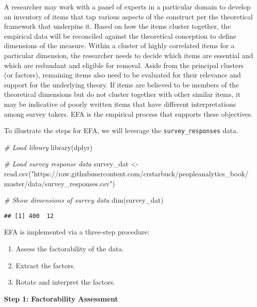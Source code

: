 \documentclass[
]{book}
\newenvironment{Shaded}{\begin{snugshade}}{\end{snugshade}}
\newcommand{\CommentTok}[1]{\textcolor[rgb]{0.56,0.35,0.01}{\textit{#1}}}
\newcommand{\FunctionTok}[1]{\textcolor[rgb]{0.00,0.00,0.00}{#1}}
\newcommand{\NormalTok}[1]{#1}
\newcommand{\OtherTok}[1]{\textcolor[rgb]{0.56,0.35,0.01}{#1}}
\newcommand{\StringTok}[1]{\textcolor[rgb]{0.31,0.60,0.02}{#1}}
\providecommand{\tightlist}{%
  \setlength{\itemsep}{0pt}\setlength{\parskip}{0pt}}
\begin{document}
A researcher may work with a panel of experts in a particular domain to develop an inventory of items that tap various aspects of the construct per the theoretical framework that underpins it. Based on how the items cluster together, the empirical data will be reconciled against the theoretical conception to define dimensions of the measure. Within a cluster of highly correlated items for a particular dimension, the researcher needs to decide which items are essential and which are redundant and eligible for removal. Aside from the principal clusters (or factors), remaining items also need to be evaluated for their relevance and support for the underlying theory. If items are believed to be members of the theoretical dimensions but do not cluster together with other similar items, it may be indicative of poorly written items that have different interpretations among survey takers. EFA is the empirical process that supports these objectives.

To illustrate the steps for EFA, we will leverage the \texttt{survey\_responses} data.

\begin{Shaded}
\begin{Highlighting}[]
\CommentTok{\# Load library}
\FunctionTok{library}\NormalTok{(dplyr)}

\CommentTok{\# Load survey response data}
\NormalTok{survey\_dat }\OtherTok{\textless{}{-}} \FunctionTok{read.csv}\NormalTok{(}\StringTok{"https://raw.githubusercontent.com/crstarbuck/peopleanalytics\_book/master/data/survey\_responses.csv"}\NormalTok{)}

\CommentTok{\# Show dimensions of survey data}
\FunctionTok{dim}\NormalTok{(survey\_dat)}
\end{Highlighting}
\end{Shaded}

\begin{verbatim}
## [1] 400  12
\end{verbatim}

EFA is implemented via a three-step procedure:

\begin{enumerate}
\def\labelenumi{\arabic{enumi}.}
\tightlist
\item
  Assess the factorability of the data.
\item
  Extract the factors.
\item
  Rotate and interpret the factors.
\end{enumerate}

\textbf{Step 1: Factorability Assessment}
\end{document}
